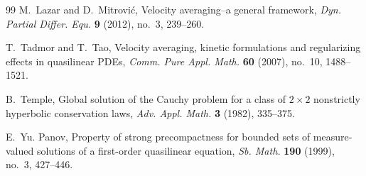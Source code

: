 \documentclass[11pt]{amsart}
\numberwithin{equation}{section}
\theoremstyle{plain}
\theoremstyle{definition}
\theoremstyle{remark}
\begin{document}
\begin{thebibliography}{99}
M.~Lazar and D.~Mitrovi\'c,
Velocity averaging--a general framework,
\emph{Dyn. Partial Differ. Equ.} \textbf{9} (2012), no.~3, 239--260.

T.~Tadmor and T.~Tao,
Velocity averaging, kinetic formulations and regularizing effects in quasilinear PDEs,
\emph{Comm. Pure Appl. Math.} \textbf{60} (2007), no.~10, 1488--1521.

B.~Temple,
Global solution of the Cauchy problem for a class of \(2\times2\) nonstrictly hyperbolic conservation laws,
\emph{Adv. Appl. Math.} \textbf{3} (1982), 335--375.

E.~Yu. Panov,
Property of strong precompactness for bounded sets of measure-valued solutions of a first-order quasilinear equation,
\emph{Sb. Math.} \textbf{190} (1999), no.~3, 427--446.

\end{thebibliography}
 
 
\end{document}
